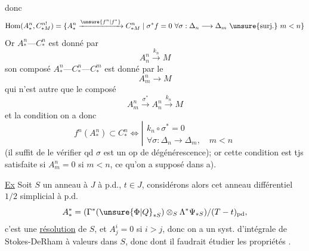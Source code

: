 
donc
\[
\operatorname{Hom}(A_*^n,C_{*M}^{n!})
=\{A_*^n\xrightarrow{\unsure{f^n|f^*}}C_{*M}^n\mid
\sigma^*f=0\ \forall\sigma:\Delta_n\longrightarrow\Delta_m\
\unsure{\text{surj.}}\ m<n\}
\]
Or $A_*^n\text{---}C_*^n$ est donné par 
\[
A_n^n\xrightarrow{k_n}M
\]
son composé $A_*^n\text{---}C_*^n\text{---}C_*^m$ est donné par le
\[
A_m^n\longrightarrow M
\]
qui n'est autre que le composé
\[
A_m^n\xrightarrow{\sigma^*}A_n^n\xrightarrow{k_n}M
\]
et la condition  on a donc
\[
f^n(A_*^n)\subset C_*^n
\Longleftrightarrow
\left|\begin{array}{l}
k_n\circ\sigma^*=0\\
\forall\sigma:\Delta_n\longrightarrow\Delta_m,\quad m<n
\end{array}\right.
\]
(il suffit de le vérifier qd $\sigma$ est un op de dégénérescence); or cette condition est tjs satisfaite si $A_m^n=0$ si $m<n$, ce qu'on a supposé dans a).

\uline{Ex} Soit $S$ un anneau à  $J$ à p.d., $t\in J$, considérons alors cet anneau différentiel $1/2$ simplicial à p.d.
\[
A_*^*=(\Gamma^*(\unsure{\Phi|Q}_{*S})\otimes_S\Lambda^*\Psi_{*S})/(T-t)_{\mathrm{pd}},
\]
c'est une \uline{résolution} de $S$, et $A_j^i=0$ si $i>j$, donc on a un syst. d'intégrale de Stokes-DeRham à valeurs dans $S$, donc
dont il faudrait étudier les propriétés .
\margin{\deleted{\unsure{p.d.}}}

